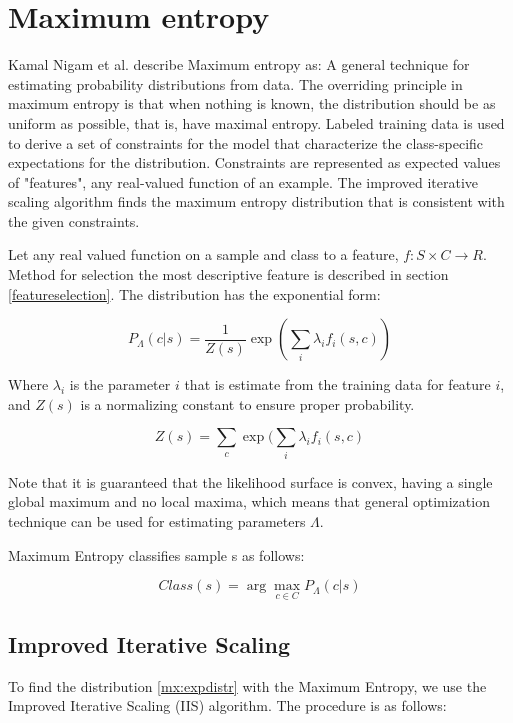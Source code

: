 \documentclass{report}
\begin{document}
\section{Maximum entropy}

Kamal Nigam et al. describe Maximum entropy as: A general technique for estimating probability distributions from data. The overriding principle in maximum entropy is that when nothing is known, the distribution should be as uniform as possible, that is, have maximal entropy. Labeled training data is used to derive a set of constraints for the model that characterize the class-specific expectations for the distribution. Constraints are represented as expected values of "features", any real-valued function of an example. The improved iterative scaling algorithm finds the maximum entropy distribution that is consistent with the given constraints.\cite{oai:CiteSeerPSU:93050}

Let any real valued function on a sample and class to a feature, $f : S \times C \rightarrow R$. Method for selection the most descriptive feature is described in section \ref{featureselection}.
The distribution has the exponential form:

\begin{equation}
\label{mx:expdistr}
P_{\Lambda}(c|s) = \frac{1}{Z(s)} \exp(\sum_{i}\lambda_i f_i(s,c))
\end{equation}

Where $\lambda_i$ is the parameter $i$ that is estimate from the training data for feature $i$, and $Z(s)$ is a normalizing constant to ensure proper probability. 

\[
Z(s) = \sum_c \exp(\sum_i \lambda_i f_i(s,c)
\]

Note that it is guaranteed that the likelihood surface is convex, having a single global maximum and no local maxima, which means that general optimization technique can be used for estimating parameters $\Lambda$.

Maximum Entropy classifies sample s as follows:

\[
Class(s)  = \arg \max_{c \in C} P_{\Lambda}(c|s)
\]

\subsection{Improved Iterative Scaling}

To find the distribution \ref{mx:expdistr} with the Maximum Entropy, we use the Improved Iterative Scaling (IIS) \cite{berger:gental} algorithm. The procedure is as follows:
\end{document}
